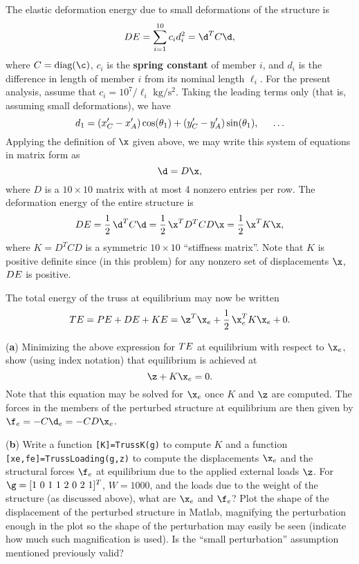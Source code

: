\begin{exercise}
The elastic deformation energy due to small deformations of the structure is
\begin{equation*}
\DE=\sum_{i=1}^{10} c_{i} d_{i}^2 = \d^T C \d,
\end{equation*}
where $C=\textrm{diag}(\c)$,
$c_i$ is the {\bf spring constant} of member $i$, and
$d_{i}$ is the difference in length of member $i$ from its nominal length $\ell_i$.  For the present analysis,
assume that $c_i=10^7/\ell_i\,\,\textrm{kg}/\textrm{s}^2$.  Taking
the leading terms only (that is, assuming small deformations), we have
\begin{equation*}
d_{1}=(x'_C-x'_A)\cos(\theta_1) + (y'_C-y'_A) \sin(\theta_1), \hskip0.2in \ldots
\end{equation*}
Applying the definition of $\x$ given above, we may write this system
of equations in matrix form as
\begin{equation*}
\d=D\x,
\end{equation*}
where $D$ is a $10\times 10$ matrix with at most 4 nonzero entries per row.  The deformation energy of the entire
structure is
\begin{equation*}
\DE = \frac{1}{2}\,\d^T C \d = \frac{1}{2}\,\x^T D^T C D \x = \frac{1}{2}\,\x^T K \x,
\end{equation*}
where $K=D^T C D$ is a symmetric $10\times 10$ ``stiffness matrix''.
Note that $K$ is positive definite since (in this problem) for any
nonzero set of displacements $\x$, $DE$ is positive.

The total energy of the truss at equilibrium may now be written
\begin{equation*}
\TE = \PE+\DE+\KE =\z^T \x_e + {1\over 2}\,\x_e^T K \x_e + 0.
\end{equation*}
\vskip0.1in

\noindent ({\bf a}) Minimizing the above expression for $TE$ at equilibrium with
respect to $\x_e$, show (using index notation) that equilibrium is
achieved at
\begin{equation*}
\z + K \x_e = 0.
\end{equation*}
Note that this equation may be solved for $\x_e$ once $K$ and $\z$ are
computed.  The forces in the members of the perturbed structure at equilibrium are then given
by $\f_e=-C \d_e=-C D \x_e$.
\vskip0.2in

\noindent ({\bf b}) Write a function {\tt [K]=TrussK(g)} to compute
$K$ and a function {\tt [xe,fe]=TrussLoading(g,z)} to compute the
displacements $\x_e$ and the structural forces $\f_e$ at equilibrium due to the applied
external loads $\z$.  For $\g=[1\ 0\ 1\ 1\ 2\ 0\ 2\ 1]^T$, $W=1000$,
and the loads due to the weight of the structure (as discussed above),
what are $\x_e$ and $\f_e$?  Plot the shape of the displacement of the perturbed structure in Matlab, magnifying the
perturbation enough in the plot so the shape of the perturbation may easily
be seen (indicate how much such magnification is used).  Is the ``small perturbation'' assumption mentioned previously valid?
\end{exercise}
\clearpage

